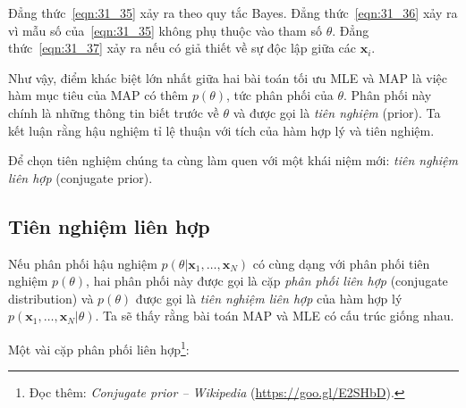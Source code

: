 Đẳng thức~\eqref{eqn:31_35} xảy ra theo quy tắc Bayes. Đẳng
thức~\eqref{eqn:31_36} xảy ra vì mẫu số của~\eqref{eqn:31_35} không phụ thuộc vào
tham số $\theta$. Đẳng thức~\eqref{eqn:31_37} xảy ra nếu có giả thiết về
sự độc lập giữa các $\mathbf{x}_i$.


Như vậy, điểm khác biệt lớn nhất giữa hai bài toán tối ưu MLE và MAP là việc hàm
mục tiêu của MAP có thêm $p(\theta)$, tức phân phối của $\theta$. Phân phối này
chính là những thông tin biết trước về $\theta$ và được gọi là
\textit{tiên nghiệm} (prior). Ta kết luận rằng hậu nghiệm tỉ lệ thuận với
tích của hàm hợp lý và tiên nghiệm.


Để chọn tiên nghiệm chúng ta cùng làm quen với một khái
niệm mới: \textit{tiên nghiệm liên hợp} (conjugate prior).


\subsection{Tiên nghiệm liên hợp}
Nếu phân phối hậu nghiệm $p(\theta | \mathbf{x}_1, \dots,
\mathbf{x}_N)$ có cùng dạng với phân phối tiên nghiệm $p(\theta)$, hai phân phối này được gọi là cặp \textit{phân phối liên hợp} (conjugate distribution) và $p(\theta)$ được
gọi là \textit{tiên nghiệm liên hợp} của hàm hợp lý $p(\mathbf{x}_1, \dots,
\mathbf{x}_N | \theta)$. Ta sẽ thấy rằng bài toán MAP và MLE có cấu trúc giống nhau.


Một vài cặp phân phối liên hợp\footnote{Đọc thêm:
\textit{Conjugate prior -- Wikipedia} (\url{https://goo.gl/E2SHbD}).}:

